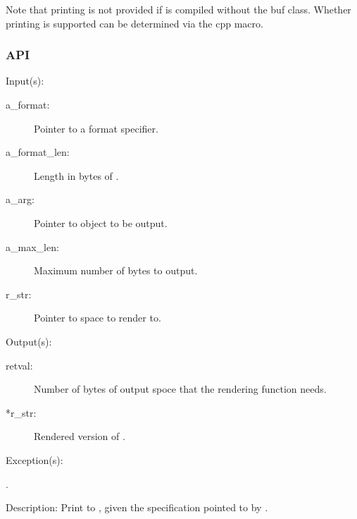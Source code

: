 Note that  printing is not provided if  is
compiled without the buf class.  Whether  printing is supported
can be determined via the
 cpp macro.

\subsubsection{API}
\begin{capi}
\label{cw_out_render_t}
	\begin{capilist}
	\item[Input(s): ]
		\begin{description}\item[]
		\item[a\_format: ]
			Pointer to a format specifier.
		\item[a\_format\_len: ]
			Length in bytes of .
		\item[a\_arg: ]
			Pointer to object to be output.
		\item[a\_max\_len: ]
			Maximum number of bytes to output.
		\item[r\_str: ]
			Pointer to space to render to.
		\end{description}
	\item[Output(s): ]
		\begin{description}\item[]
		\item[retval: ]
			Number of bytes of output spoce that the rendering
			function needs.
		\item[*r\_str: ]
			Rendered version of .
		\end{description}
	\item[Exception(s): ]
		\begin{description}\item[]
		\item[.]
		\end{description}
	\item[Description: ]
		Print  to , given the specification
		pointed to by .
	\end{capilist}
\label{out_new}

\end{capi}
